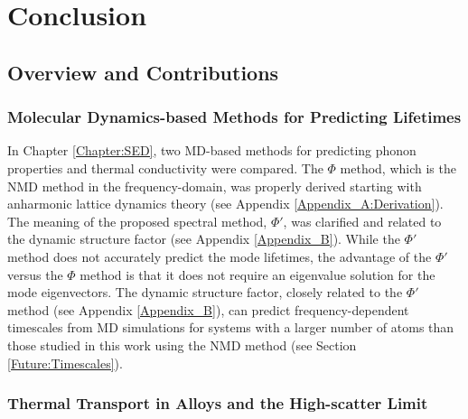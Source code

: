 \chapter{\label{Conclusion}Conclusion}

\section{\label{Overview}Overview and Contributions}

\subsection{\label{Overview:SED} 
Molecular Dynamics-based Methods for Predicting Lifetimes}

In Chapter \ref{Chapter:SED}, two MD-based methods for predicting 
phonon properties and thermal conductivity were compared. 
The $\Phi$ method, which is the NMD method in the frequency-domain, 
was properly derived starting with anharmonic lattice 
dynamics theory (see Appendix \ref{Appendix_A:Derivation}). 
The meaning of the proposed spectral method, $\Phi'$, 
was clarified and related to the dynamic structure factor 
(see Appendix \ref{Appendix_B}). 
While 
the $\Phi'$ method does not accurately predict the mode lifetimes, 
the advantage of the $\Phi'$ versus the $\Phi$ method is that it does 
not require an eigenvalue solution for the mode eigenvectors.  
The dynamic structure factor, closely related to the $\Phi'$ method 
(see Appendix \ref{Appendix_B}), can predict frequency-dependent 
timescales from MD simulations for systems with a larger number of 
atoms than those studied in this work using the NMD method 
(see Section \ref{Future:Timescales}). 

\subsection{\label{Overview:VC}
Thermal Transport in Alloys and the High-scatter Limit}

